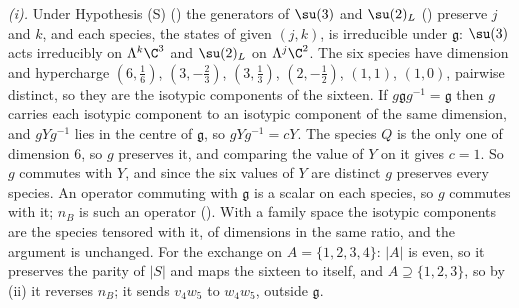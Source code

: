 \emph{(i).} Under Hypothesis (S) () the generators of $\su(3)$ and $\su(2)_{L}$ () preserve $j$ and $k$, and each species, the states of given $(j, k)$, is irreducible under $\mathfrak{g}$: $\su(3)$ acts irreducibly on $\Lambda^{k}\C^{3}$ and $\su(2)_{L}$ on $\Lambda^{j}\C^{2}$. The six species have dimension and hypercharge $(6, \tfrac16)$, $(3, -\tfrac23)$, $(3, \tfrac13)$, $(2, -\tfrac12)$, $(1, 1)$, $(1, 0)$, pairwise distinct, so they are the isotypic components of the sixteen. If $g\mathfrak{g}g^{-1} = \mathfrak{g}$ then $g$ carries each isotypic component to an isotypic component of the same dimension, and $gYg^{-1}$ lies in the centre of $\mathfrak{g}$, so $gYg^{-1} = cY$. The species $Q$ is the only one of dimension $6$, so $g$ preserves it, and comparing the value of $Y$ on it gives $c = 1$. So $g$ commutes with $Y$, and since the six values of $Y$ are distinct $g$ preserves every species. An operator commuting with $\mathfrak{g}$ is a scalar on each species, so $g$ commutes with it; $n_{B}$ is such an operator (). With a family space the isotypic components are the species tensored with it, of dimensions in the same ratio, and the argument is unchanged. For the exchange on $A = \{1, 2, 3, 4\}$: $|A|$ is even, so it preserves the parity of $|S|$ and maps the sixteen to itself, and $A \supseteq \{1, 2, 3\}$, so by (ii) it reverses $n_{B}$; it sends $v_{4}w_{5}$ to $w_{4}w_{5}$, outside $\mathfrak{g}$.

